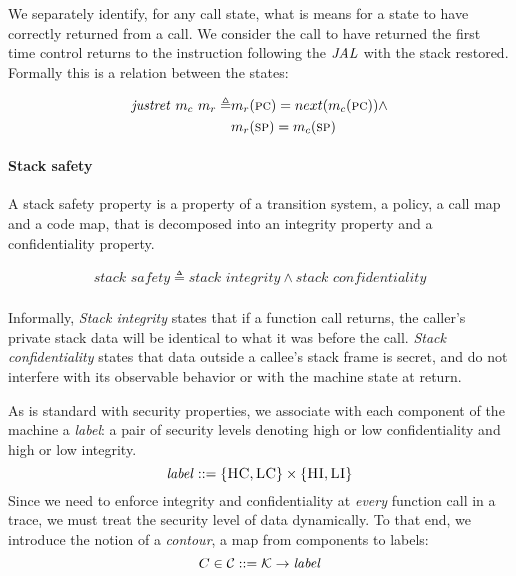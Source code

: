 \documentclass[acmsmall,review,anonymous]{acmart}\settopmatter{printfolios=true,printccs=false,printacmref=false}
\begin{document}
  We separately identify, for any call state, what is means for a state to
  have correctly returned from a call. We consider the call to have returned
  the first time control returns to the instruction following the \(\mathit{JAL}\) with
  the stack restored. Formally this is a relation between the states:
    
  \[\begin{split}
    \mathit{justret}\ m_c\ m_r \triangleq & m_r(\textsc{pc}) =
    next(m_c(\textsc{pc})) \land \\
    & m_r(\textsc{sp}) = m_c(\textsc{sp})
  \end{split}\]


\paragraph*{Stack safety}
  
  A stack safety property is a property of a transition system, a policy, a
  call map and a code map, that is decomposed into an integrity property and a
  confidentiality property.

    \[\begin{split}
      \textit{stack safety} \triangleq \textit{stack integrity} \land
      \textit{stack confidentiality} \\
    \end{split}\]

   Informally, {\it Stack
  integrity} states that if a function call returns, the caller's
  private stack data will be identical to what it was before the
  call. {\it Stack confidentiality} states that data outside a callee's
  stack frame is secret, and do not interfere with its observable
  behavior or with the machine state at return.

  As is standard with security properties, we associate with each
  component of the machine a {\em label}: a pair of security levels
  denoting high or low confidentiality and high or low integrity.
  \[\mathit{label} ::= \{\textsc{HC},\textsc{LC}\} \times \{\textsc{HI},\textsc{LI}\}\]
  Since we need to enforce integrity and confidentiality at {\em every}
  function call in a trace, we must treat the security level of data
  dynamically. To that end, we introduce the notion of a {\em contour},
  a map from components to labels:
  \[C \in {\mathcal C} ::= {\mathcal K} \rightarrow \mathit{label}\]
\end{document}
